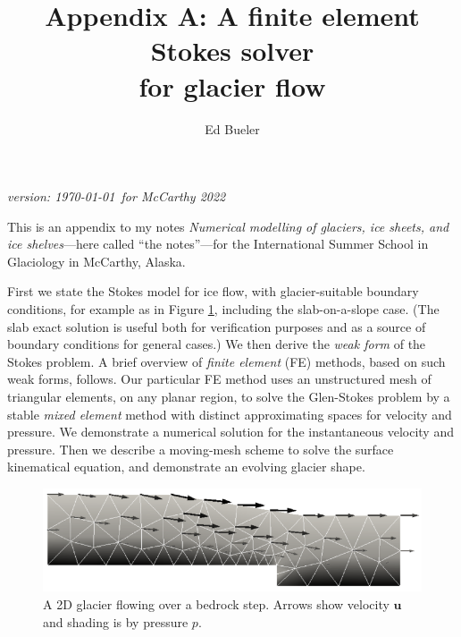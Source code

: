 \documentclass[letterpaper,final,12pt,reqno]{amsart}
\newcommand{\bu}{\mathbf{u}}
\begin{document}
\graphicspath{{figures/}}

\title[Appendix A]{Appendix A: A finite element Stokes solver \\ for glacier flow}

\author{Ed Bueler}

\maketitle

\vspace{-8mm}
\begin{center}
\footnotesize
\emph{version: \today~for McCarthy 2022}
\end{center}

\thispagestyle{empty}
\bigskip

\renewcommand{\thefigure}{A\arabic{figure}}
\renewcommand{\theequation}{A\arabic{equation}}
\renewcommand{\thesection}{A.\arabic{section}}

This is an appendix to my notes \emph{Numerical modelling of glaciers, ice sheets, and ice shelves}---here called ``the notes''---for the International Summer School in Glaciology in McCarthy, Alaska.

First we state the Stokes model for ice flow, with glacier-suitable boundary conditions, for example as in Figure \ref{fig:glacier}, including the slab-on-a-slope case.  (The slab exact solution is useful both for verification purposes and as a source of boundary conditions for general cases.)  We then derive the \emph{weak form} of the Stokes problem.  A brief overview of \emph{finite element} (FE) methods, based on such weak forms, follows.  Our particular FE method uses an unstructured mesh of triangular elements, on any planar region, to solve the Glen-Stokes problem by a stable \emph{mixed element} method with distinct approximating spaces for velocity and pressure.  We demonstrate a numerical solution for the instantaneous velocity and pressure.  Then we describe a moving-mesh scheme to solve the surface kinematical equation, and demonstrate an evolving glacier shape.

\begin{figure}[h]
\includegraphics[width=\textwidth,angle=-5.7296]{stepflowlin}  %
\caption{A 2D glacier flowing over a bedrock step.  Arrows show velocity $\bu$ and shading is by pressure $p$.}
\label{fig:glacier}
\end{figure}
\end{document}
